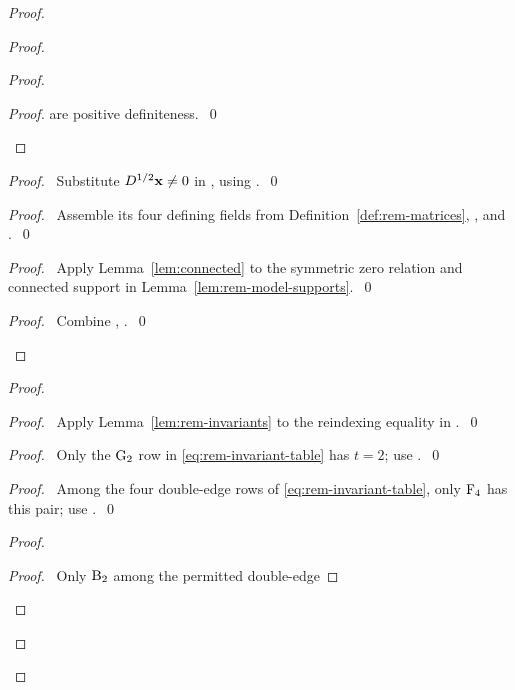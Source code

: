 \begin{proof}
\begin{proof}
\begin{proof}
\begin{proof}
 are positive definiteness.~\qed\end{proof}
\end{proof}
\begin{proof}\pf\ Substitute $D^{1/2}{\mathbf x}\ne0$ in
, using .~\qed\end{proof}
\begin{proof}\pf\ Assemble its four defining fields from
Definition~\ref{def:rem-matrices}, , 
and .~\qed\end{proof}
\begin{proof}\pf\ Apply Lemma~\ref{lem:connected} to the symmetric zero relation
and connected support in Lemma~\ref{lem:rem-model-supports}.~\qed\end{proof}
\qedstep
\begin{proof}\pf\ Combine , .~\qed\end{proof}
\end{proof}
\begin{proof}
\begin{proof}\pf\ Apply Lemma~\ref{lem:rem-invariants} to the
reindexing equality in .~\qed\end{proof}
\begin{proof}\pf\ Only the $\mathrm{G}_2$ row in
\eqref{eq:rem-invariant-table} has $t=2$; use .~\qed\end{proof}
\begin{proof}\pf\ Among the four double-edge rows of
\eqref{eq:rem-invariant-table}, only $\mathrm{F}_4$ has this pair;
use .~\qed\end{proof}
\begin{proof}
\begin{proof}\pf\ Only $\mathrm{B}_2$ among the permitted double-edge

\end{proof}
\end{proof}
\end{proof}
\end{proof}
